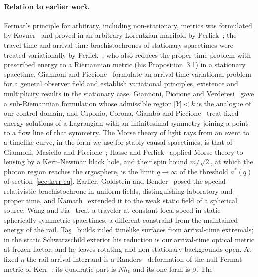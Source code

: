 \documentclass[aip,jmp,amsmath,amssymb,reprint]{revtex4-2}
\theoremstyle{plain}
\theoremstyle{definition}
\begin{document}
\paragraph{Relation to earlier work.} Fermat's principle for arbitrary, including non-stationary, metrics was formulated by
Kovner~\cite{Kovner1990} and proved in an arbitrary Lorentzian manifold by Perlick~\cite{Perlick1990}; the travel-time and arrival-time brachistochrones of stationary
spacetimes were treated variationally by Perlick~\cite{Perlick1991}, who also reduces the proper-time
problem with prescribed energy to a Riemannian metric (his Proposition~3.1) in a stationary spacetime.
Giannoni and Piccione~\cite{GiannoniPiccione2002} formulate an arrival-time variational problem for a
general observer field and establish variational principles, existence and multiplicity results in
the stationary case. Giannoni, Piccione and Verderesi~\cite{GiannoniPiccioneVerderesi1997} gave a sub-Riemannian
formulation whose admissible region $|Y|<k$ is the analogue of our control domain, and Caponio, Corona, Giamb\`o and
Piccione~\cite{CaponioCoronaGiamboPiccione2024} treat fixed-energy solutions of a Lagrangian with an infinitesimal
symmetry joining a point to a flow line of that symmetry. The Morse theory of light rays from an event to a timelike curve, in the form we
use for stably causal spacetimes, is that of Giannoni, Masiello and
Piccione~\cite{GiannoniMasielloPiccioneMorse}; Hasse and Perlick~\cite{HassePerlick2006} applied Morse
theory to lensing by a Kerr--Newman black hole, and their spin bound $m/\sqrt2$, at which the photon
region reaches the ergosphere, is the limit $q\to\infty$ of the threshold $a^*(q)$ of
section~\ref{sec:kerr-eq}. Earlier, Goldstein and Bender~\cite{GoldsteinBender1986} posed the special-relativistic
brachistochrone in uniform fields, distinguishing laboratory and proper time, and Kamath~\cite{Kamath1988} extended it
to the weak static field of a spherical source; Wang and Jia~\cite{WangJia2026} treat a traveler at constant local
speed in static spherically symmetric spacetimes, a different constraint from the maintained energy of the rail.
Ta\c{s}~\cite{Tas2025} builds ruled timelike surfaces from arrival-time extremals; in the static Schwarzschild
exterior his reduction is our arrival-time optical metric at frozen factor, and he leaves rotating and
non-stationary backgrounds open. At fixed $\eta$ the rail arrival integrand is a Randers~\cite{Randers1941} deformation of the null
Fermat metric of Kerr~\cite{GibbonsWerner2008}: its quadratic part is $Nh_0$ and its one-form is $\beta$. The
\end{document}
